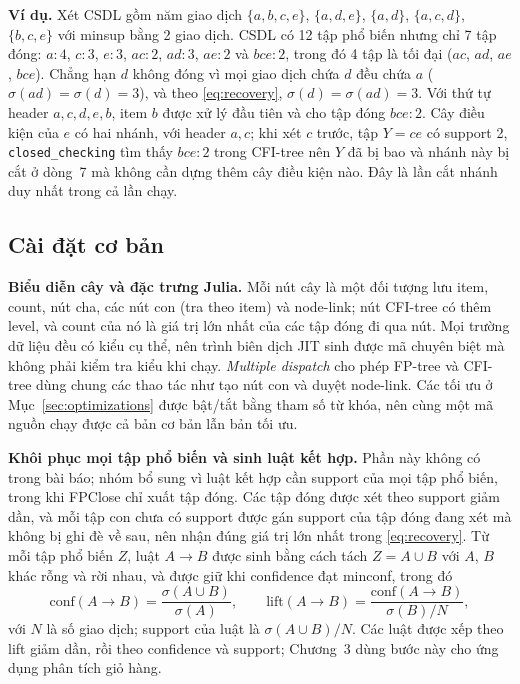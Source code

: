 \textbf{Ví dụ.} Xét CSDL gồm năm giao dịch $\{a,b,c,e\}$, $\{a,d,e\}$, $\{a,d\}$, $\{a,c,d\}$, $\{b,c,e\}$ với minsup
bằng 2 giao dịch. CSDL có 12 tập phổ biến nhưng chỉ 7 tập đóng: $a{:}4$, $c{:}3$, $e{:}3$, $ac{:}2$, $ad{:}3$, $ae{:}2$
và $bce{:}2$, trong đó 4 tập là tối đại ($ac$, $ad$, $ae$, $bce$). Chẳng hạn $d$ không đóng vì mọi giao dịch chứa $d$ đều chứa $a$ ($\sigma(ad) = \sigma(d) = 3$), và theo
\eqref{eq:recovery}, $\sigma(d) = \sigma(ad) = 3$. Với thứ tự header $a, c, d, e, b$, item $b$ được xử lý đầu tiên và
cho tập đóng $bce{:}2$. Cây điều kiện của $e$ có hai nhánh, với header $a, c$; khi xét $c$ trước, tập $Y = ce$ có support
2, \texttt{closed\_checking} tìm thấy $bce{:}2$ trong CFI-tree nên $Y$ đã bị bao và nhánh này bị cắt ở dòng~7 mà
không cần dựng thêm cây điều kiện nào. Đây là lần cắt nhánh duy nhất trong cả lần chạy.

\subsection{Cài đặt cơ bản}
\label{sec:basic}
\textbf{Biểu diễn cây và đặc trưng Julia.} Mỗi nút cây là một đối tượng lưu item, count, nút cha, các nút con (tra theo
item) và node-link; nút CFI-tree có thêm level, và count của nó là giá trị lớn nhất của các tập đóng đi qua nút. Mọi
trường dữ liệu đều có kiểu cụ thể, nên trình biên dịch JIT sinh được mã chuyên biệt mà không phải kiểm tra kiểu khi
chạy. \textit{Multiple dispatch} cho phép FP-tree và CFI-tree dùng chung các thao tác như tạo nút con và duyệt
node-link. Các tối ưu ở Mục~\ref{sec:optimizations} được bật/tắt bằng tham số từ khóa, nên cùng một mã nguồn chạy được
cả bản cơ bản lẫn bản tối ưu.

\textbf{Khôi phục mọi tập phổ biến và sinh luật kết hợp.} Phần này không có trong bài báo; nhóm bổ sung vì luật kết
hợp cần support của mọi tập phổ biến, trong khi FPClose chỉ xuất tập đóng. Các tập đóng được xét theo support giảm
dần, và mỗi tập con chưa có support được gán support của tập đóng đang xét mà không bị ghi đè về sau, nên nhận đúng giá
trị lớn nhất trong \eqref{eq:recovery}. Từ mỗi tập phổ biến $Z$, luật $A \rightarrow B$ được sinh bằng cách tách
$Z = A \cup B$ với $A$, $B$ khác rỗng và rời nhau, và được giữ khi confidence đạt minconf, trong đó
\begin{equation}
  \mathrm{conf}(A \rightarrow B) = \frac{\sigma(A \cup B)}{\sigma(A)},\qquad
  \mathrm{lift}(A \rightarrow B) = \frac{\mathrm{conf}(A \rightarrow B)}{\sigma(B)/N},
\end{equation}
với $N$ là số giao dịch; support của luật là $\sigma(A \cup B)/N$. Các luật được xếp theo lift giảm dần, rồi theo
confidence và support; Chương~3 dùng bước này cho ứng dụng phân tích giỏ hàng.

